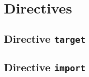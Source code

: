 




\chapter{Directives}



\section{Directive \texttt{target}}





\section{Directive \texttt{import}}


